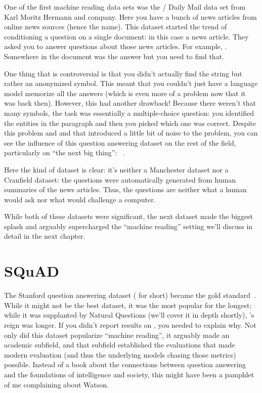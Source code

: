 One of the first machine reading data sets was the  / Daily
Mail data set from Karl Moritz Hermann and company.  Here you have a
bunch of news articles from online news sources (hence the name).
%
This dataset started the trend of conditioning a question on a single
document: in this case a news article.
%
They asked you to answer questions about those news articles.  For
example, .  Somewhere in
the document was the answer  but you need to find
that.

One thing that is controversial is that you didn’t actually find the
string  but rather an anonymized symbol.
%
This meant that you couldn’t just have a language model memorize all
the answers (which is even more of a problem now that it was back
then).  However, this had another drawback!
%
Because there weren’t that many symbols, the task was essentially a
multiple-choice question: you identified the entities in the paragraph
and then you picked which one was correct.
%
Despite this problem and and that introduced a little bit of noise to
the problem, you can see the influence of this question answering
dataset on the rest of the field, particularly on ``the next big
thing'': \squad{}~\citep{hermann-15}.

Here the kind of dataset is clear: it's neither a Manchester dataset
nor a Cranfield dataset: the questions were automatically generated
from human summaries of the news articles.
%
Thus, the questions are neither what a human would ask nor what would
challenge a computer.

While both of these datasets were significant, the next dataset made
the biggest splash and arguably supercharged the ``machine reading''
setting we'll discuss in detail in the next chapter.

\section{SQuAD}

The Stanford question answering dataset (\squad{} for short) became
the gold standard~\citep{rajpurkar-16}.
%
While it might not be the best dataset, it was the most popular for
the longest; while it was supplanted by Natural Questions (we'll cover
it in depth shortly), \squad{}'s reign was longer.
%
If you didn't report results on \squad{}, you needed to explain why.
%
Not only did this dataset popularize ``machine reading'', it arguably
made  an academic subfield, and that subfield established the
evaluations that made modern  evaluation (and thus the
underlying models chasing those metrics) possible.
%
Instead of a book about the connections between question answering and
the foundations of intelligence and society, this might have been a
pamphlet of me complaining about Watson.

